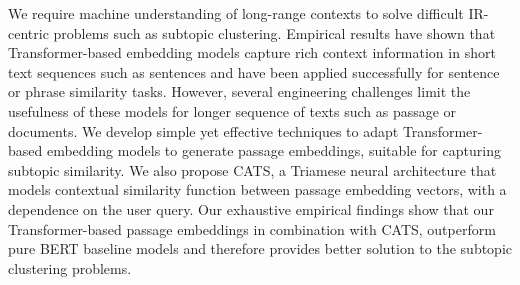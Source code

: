 We require machine understanding of long-range contexts to solve difficult IR-centric problems such as subtopic clustering. Empirical results have shown that Transformer-based embedding models capture rich context information in short text sequences such as sentences and have been applied successfully for sentence or phrase similarity tasks. However, several engineering challenges limit the usefulness of these models for longer sequence of texts such as passage or documents. We develop simple yet effective techniques to adapt Transformer-based embedding models to generate passage embeddings, suitable for capturing subtopic similarity. We also propose CATS, a Triamese neural architecture that models contextual similarity function between passage embedding vectors, with a dependence on the user query. Our exhaustive empirical findings show that our Transformer-based passage embeddings in combination with CATS, outperform pure BERT baseline models and therefore provides better solution to the subtopic clustering problems.